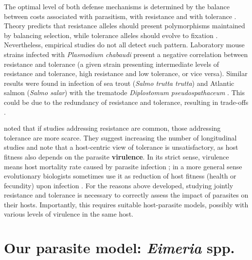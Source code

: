 \par
The optimal level of both defense mechanisms is determined by the balance between costs associated with parasitism, with resistance and with tolerance \citep{sheldon_ecological_1996}. Theory predicts that resistance alleles should present polymorphisms maintained by balancing selection, while tolerance alleles should evolve to fixation \citep{roy_evolutionary_2000, miller_evolution_2006}. Nevertheless, empirical studies do not all detect such pattern. Laboratory mouse strains infected with \textit{Plasmodium chabaudi} \citep{raaberg_disentangling_2007} present a negative correlation between resistance and tolerance (a given strain presenting intermediate levels of resistance and tolerance, high resistance and low tolerance, or vice versa). Similar results were found in infection of sea trout (\textit{Salmo trutta trutta}) and Atlantic salmon (\textit{Salmo salar}) with the trematode \textit{Diplostomum pseudospathaceum} \citep{klemme_vertebrate_2016}. This could be due to the redundancy of resistance and tolerance, resulting in trade-offs \citep{restif_concurrent_2004, fornoni_evolution_2004}. 
\par
\cite{kutzer_maximising_2016} noted that if studies addressing resistance are common, those addressing tolerance are more scarce. They suggest increasing the number of longitudinal studies and note that a host-centric view of tolerance is unsatisfactory, as host fitness also depends on the parasite \textbf{virulence}. In its strict sense, virulence means host mortality rate caused by parasite infection \citep{anderson_coevolution_1982}; in a more general sense evolutionary biologists sometimes use it as reduction of host fitness (health or fecundity) upon infection \citep{little_coevolution_2010}. For the reasons above developed, studying jointly resistance and tolerance is necessary to correctly assess the impact of parasites on their hosts. Importantly, this requires suitable host-parasite models, possibly with various levels of virulence in the same host.

\section{Our parasite model: \textit{Eimeria} spp.}
